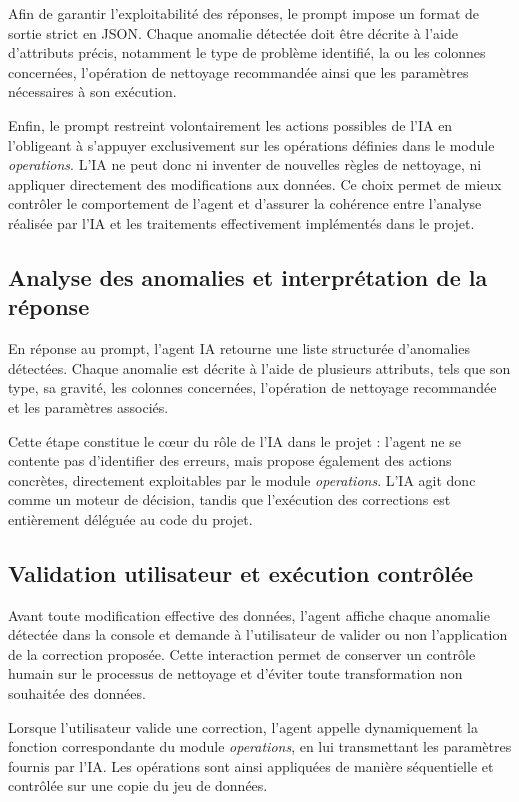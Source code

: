 \documentclass[a4paper, 12pt, twoside]{article}
\begin{document}
Afin de garantir l’exploitabilité des réponses, le prompt impose un format de sortie strict en JSON. Chaque anomalie détectée doit être décrite à l’aide d’attributs précis, notamment le type de problème identifié, la ou les colonnes concernées, l’opération de nettoyage recommandée ainsi que les paramètres nécessaires à son exécution.

Enfin, le prompt restreint volontairement les actions possibles de l’IA en l’obligeant à s’appuyer exclusivement sur les opérations définies dans le module \textit{operations}. L’IA ne peut donc ni inventer de nouvelles règles de nettoyage, ni appliquer directement des modifications aux données. Ce choix permet de mieux contrôler le comportement de l’agent et d’assurer la cohérence entre l’analyse réalisée par l’IA et les traitements effectivement implémentés dans le projet.


\subsection{Analyse des anomalies et interprétation de la réponse}

En réponse au prompt, l’agent IA retourne une liste structurée d’anomalies détectées. Chaque anomalie est décrite à l’aide de plusieurs attributs, tels que son type, sa gravité, les colonnes concernées, l’opération de nettoyage recommandée et les paramètres associés.

Cette étape constitue le cœur du rôle de l’IA dans le projet : l’agent ne se contente pas d’identifier des erreurs, mais propose également des actions concrètes, directement exploitables par le module \textit{operations}. L’IA agit donc comme un moteur de décision, tandis que l’exécution des corrections est entièrement déléguée au code du projet.

\subsection{Validation utilisateur et exécution contrôlée}

Avant toute modification effective des données, l’agent affiche chaque anomalie détectée dans la console et demande à l’utilisateur de valider ou non l’application de la correction proposée. Cette interaction permet de conserver un contrôle humain sur le processus de nettoyage et d’éviter toute transformation non souhaitée des données.

Lorsque l’utilisateur valide une correction, l’agent appelle dynamiquement la fonction correspondante du module \textit{operations}, en lui transmettant les paramètres fournis par l’IA. Les opérations sont ainsi appliquées de manière séquentielle et contrôlée sur une copie du jeu de données.
\end{document}
